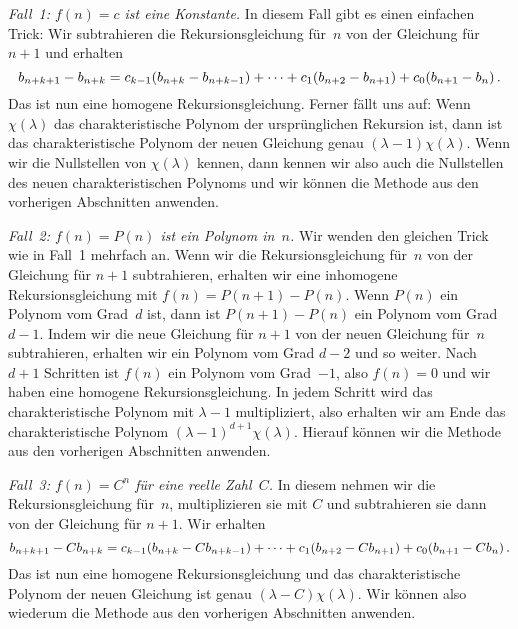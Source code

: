 \emph{Fall~1: $f(n)=c$ ist eine Konstante.} In diesem Fall gibt es einen einfachen Trick: Wir subtrahieren die Rekursionsgleichung für~$n$ von der Gleichung für $n+1$ und erhalten
\begin{equation*}
	b_{n+k+1}-b_{n+k}=c_{k-1}\parens*{b_{n+k}-b_{n+k-1}}+\dotsb+c_1\parens*{b_{n+2}-b_{n+1}}+c_0\parens*{b_{n+1}-b_n}\,.
\end{equation*}
Das ist nun eine homogene Rekursionsgleichung. Ferner fällt uns auf: Wenn $\chi(\lambda)$ das charakteristische Polynom der ursprünglichen Rekursion ist, dann ist das charakteristische Polynom der neuen Gleichung genau $(\lambda-1)\chi(\lambda)$. Wenn wir die Nullstellen von $\chi(\lambda)$ kennen, dann kennen wir also auch die Nullstellen des neuen charakteristischen Polynoms und wir können die Methode aus den vorherigen Abschnitten anwenden.

\emph{Fall~2: $f(n)=P(n)$ ist ein Polynom in~$n$.} Wir wenden den gleichen Trick wie in Fall~1 mehrfach an. Wenn wir die Rekursionsgleichung für~$n$ von der Gleichung für $n+1$ subtrahieren, erhalten wir eine inhomogene Rekursionsgleichung mit $f(n)=P(n+1)-P(n)$. Wenn $P(n)$ ein Polynom vom Grad~$d$ ist, dann ist $P(n+1)-P(n)$ ein Polynom vom Grad~$d-1$. Indem wir die neue Gleichung für $n+1$ von der neuen Gleichung für~$n$ subtrahieren, erhalten wir ein Polynom vom Grad $d-2$ und so weiter. Nach $d+1$ Schritten ist $f(n)$ ein Polynom vom Grad~$-1$, also $f(n)=0$ und wir haben eine homogene Rekursionsgleichung. In jedem Schritt wird das charakteristische Polynom mit $\lambda-1$ multipliziert, also erhalten wir am Ende das charakteristische Polynom $(\lambda-1)^{d+1}\chi(\lambda)$. Hierauf können wir die Methode aus den vorherigen Abschnitten anwenden.

\emph{Fall~3: $f(n)=C^n$ für eine reelle Zahl~$C$.} In diesem nehmen wir die Rekursionsgleichung für~$n$, multiplizieren sie mit $C$ und subtrahieren sie dann von der Gleichung für $n+1$. Wir erhalten
\begin{equation*}
	b_{n+k+1}-Cb_{n+k}=c_{k-1}\parens*{b_{n+k}-Cb_{n+k-1}}+\dotsb+c_1\parens*{b_{n+2}-Cb_{n+1}}+c_0\parens*{b_{n+1}-Cb_n}\,.
\end{equation*}
Das ist nun eine homogene Rekursionsgleichung und das charakteristische Polynom der neuen Gleichung ist genau $(\lambda-C)\chi(\lambda)$. Wir können also wiederum die Methode aus den vorherigen Abschnitten anwenden.

